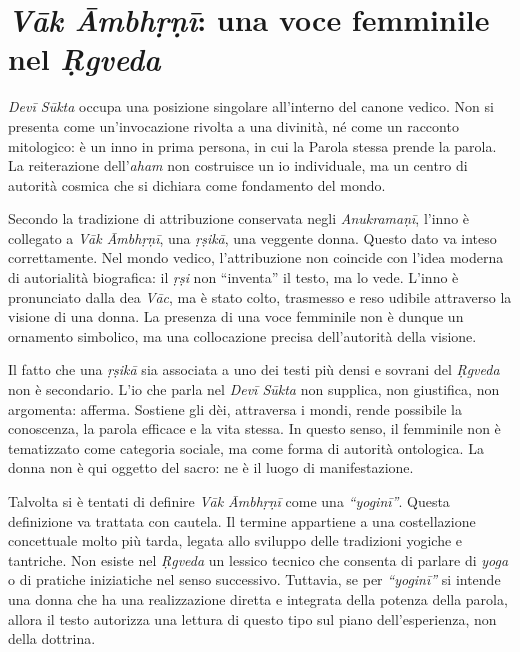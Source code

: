 \chapter*{\textit{Vāk Āmbhṛṇī}: una voce femminile nel \textit{Ṛgveda}}

\textit{Devī Sūkta} occupa una posizione singolare all’interno del canone vedico. Non si presenta come un’invocazione rivolta a una divinità, né come un racconto mitologico: è un inno in prima persona, in cui la Parola stessa prende la parola. La reiterazione dell’\textit{aham} non costruisce un io individuale, ma un centro di autorità cosmica che si dichiara come fondamento del mondo.

Secondo la tradizione di attribuzione conservata negli \textit{Anukramaṇī}, l’inno è collegato a \textit{Vāk Āmbhṛṇī}, una \textit{ṛṣikā}, una veggente donna. Questo dato va inteso correttamente. Nel mondo vedico, l’attribuzione non coincide con l’idea moderna di autorialità biografica: il \textit{ṛṣi} non “inventa” il testo, ma lo vede. L’inno è pronunciato dalla dea \textit{Vāc}, ma è stato colto, trasmesso e reso udibile attraverso la visione di una donna. La presenza di una voce femminile non è dunque un ornamento simbolico, ma una collocazione precisa dell’autorità della visione.

Il fatto che una \textit{ṛṣikā} sia associata a uno dei testi più densi e sovrani del \textit{Ṛgveda} non è secondario. L’io che parla nel \textit{Devī Sūkta} non supplica, non giustifica, non argomenta: afferma. Sostiene gli dèi, attraversa i mondi, rende possibile la conoscenza, la parola efficace e la vita stessa. In questo senso, il femminile non è tematizzato come categoria sociale, ma come forma di autorità ontologica. La donna non è qui oggetto del sacro: ne è il luogo di manifestazione.

Talvolta si è tentati di definire \textit{Vāk Āmbhṛṇī} come una \textit{“yoginī”}. Questa definizione va trattata con cautela. Il termine appartiene a una costellazione concettuale molto più tarda, legata allo sviluppo delle tradizioni yogiche e tantriche. Non esiste nel \textit{Ṛgveda} un lessico tecnico che consenta di parlare di \textit{yoga} o di pratiche iniziatiche nel senso successivo. Tuttavia, se per \textit{“yoginī”} si intende una donna che ha una realizzazione diretta e integrata della potenza della parola, allora il testo autorizza una lettura di questo tipo sul piano dell’esperienza, non della dottrina.


